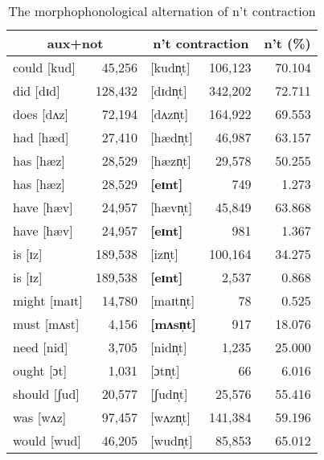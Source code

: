 \documentclass[output=paper,
modfonts
]{LSP/langsci}
\begin{document}
\begin{table}[h!] 
\begin{center}
\caption{The morphophonological alternation of n't
  contraction} 
\vspace{0.2in}
\begin{tabular}{|lr|lr|r|} \hline
\multicolumn{2}{|c|}{aux+not}  &  \multicolumn{2}{|c|}{n't contraction}  &
                                                                     n't
                                                                         (\%)  \\ \hline \hline
could [kud] & 45,256 & [kudn̩t]  & 106,123 &
                                                          \hspace{0.15cm} 70.104 \\ 
did [dɪd]  & 128,432 & [dɪdn̩t] & 342,202 & 72.711 \\
does [dʌz] &72,194& [dʌzn̩t] & 164,922 & 69.553\\
had [hæd] &27,410  & [hædn̩t] & 46,987 & 63.157\\
has [hæz] & 28,529  & [hæzn̩t] & 29,578 &
                                                               50.255\\
has [hæz] & 28,529  & {\textbf{[eɪnt]}} &749 &
                                                               1.273\\
have [hæv] & 24,957& [hævn̩t] & 45,849 &
                                                              63.868\\
have [hæv] & 24,957& {\textbf{[eɪnt]}} & 981 &
                                                              1.367\\
is  [ɪz] &  189,538& [izn̩t] & 100,164 & 34.275\\
is  [ɪz] &  189,538& {\textbf{[eɪnt]}} & 2,537 & 0.868\\
might  [maɪt] & 14,780 & [maɪtn̩t] &
                                                                      78 & 0.525\\
must  [mʌst] & 4,156 & {\textbf{[mʌsn̩t]}} &  917 & 18.076\\
need  [nid]  & 3,705 & [nidn̩t] & 1,235 & 25.000\\
ought  [ɔt] & 1,031  & [ɔtn̩t] & 66 & 6.016 \\
should  [ʃud] & 20,577  & [ʃudn̩t] & 25,576 &
  55.416\\
was  [wʌz] &97,457  & [wʌzn̩t] & 141,384 & 59.196\\
would [wud] &46,205 & [wudn̩t] & 85,853 & 65.012 \\
 \hline  \hline


\end{tabular}
\end{center}
\end{table}
\end{document}
